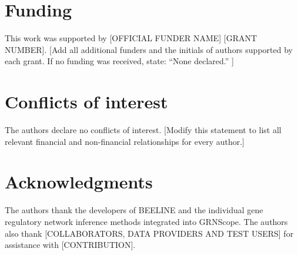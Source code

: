 \documentclass[unnumsec,webpdf,modern,large]{oup-authoring-template}%
\begin{document}
\section{Funding}

This work was supported by [OFFICIAL FUNDER NAME] [GRANT NUMBER]. [Add all additional funders and the initials of authors supported by each grant. If no funding was received, state: ``None declared.'' ]

\section{Conflicts of interest}

The authors declare no conflicts of interest. [Modify this statement to list all relevant financial and non-financial relationships for every author.]

\section{Acknowledgments}

The authors thank the developers of BEELINE and the individual gene regulatory network inference methods integrated into GRNScope. The authors also thank [COLLABORATORS, DATA PROVIDERS AND TEST USERS] for assistance with [CONTRIBUTION].
\end{document}
